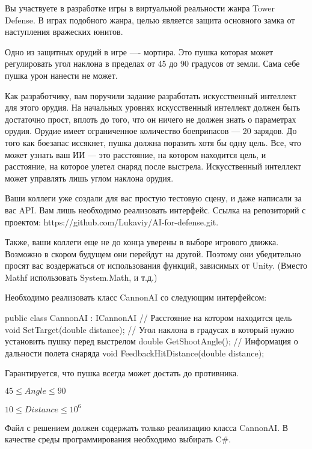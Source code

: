 
Вы участвуете в разработке игры в виртуальной реальности жанра Tower Defense. В играх подобного жанра, целью является защита основного замка от наступления вражеских юнитов.

Одно из защитных орудий в игре —- мортира. Это пушка которая может регулировать угол наклона в пределах от 45 до 90 градусов от земли. Сама себе пушка урон нанести не может.

Как разработчику, вам поручили задание разработать искусственный интеллект для этого орудия. На начальных уровнях искусственный интеллект должен быть достаточно прост, вплоть до того, что он ничего не должен знать о параметрах орудия. Орудие имеет ограниченное количество боеприпасов — 20 зарядов. До того как боезапас иссякнет, пушка должна поразить хотя бы одну цель. Все, что может узнать ваш ИИ — это расстояние, на котором находится цель, и расстояние, на которое улетел снаряд после выстрела. Искусственный интеллект может управлять лишь углом наклона орудия.

Ваши коллеги уже создали для вас простую тестовую сцену, и даже написали за вас API. Вам лишь необходимо реализовать интерфейс. Ссылка на репозиторий с проектом: https://github.com/Lukaviy/AI-for-defense.git.

Также, ваши коллеги еще не до конца уверены в выборе игрового движка. Возможно в скором будущем они перейдут на другой. Поэтому они убедительно просят вас воздержаться от использования функций, зависимых от Unity. (Вместо Mathf использовать System.Math, и т.д.)

Необходимо реализовать класс CannonAI со следующим интерфейсом:
     
        public class CannonAI : ICannonAI
        {
            // Расстояние на котором находится цель
            void SetTarget(double distance);
            // Угол наклона в градусах в который нужно установить пушку перед выстрелом
            double GetShootAngle();
            // Информация о дальности полета снаряда
            void FeedbackHitDistance(double distance);
        }


Гарантируется, что пушка всегда может достать до противника.

$45\leq Angle \leq 90$

$10\leq Distance \leq 10^6$
        
\outputfmtSection

Файл с решением должен содержать только реализацию класса CannonAI. В качестве среды программирования необходимо выбирать C\#.

